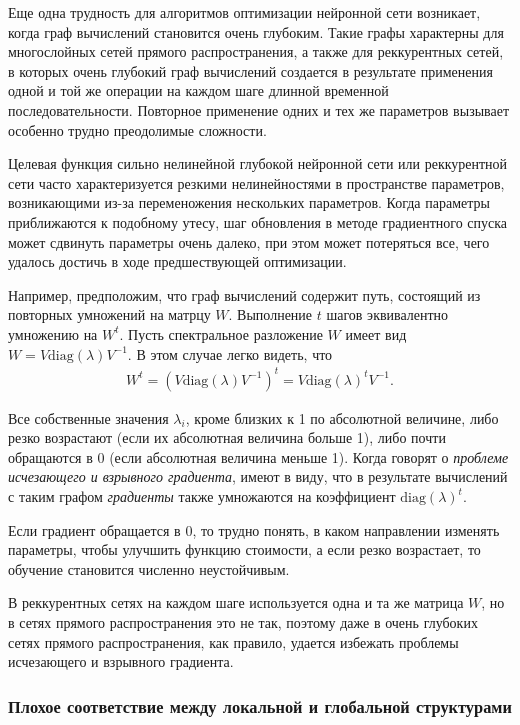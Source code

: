 \documentclass[%
	11pt,
	a4paper,
	utf8,
]{article}
\begin{document}
Еще одна трудность для алгоритмов оптимизации нейронной сети возникает, когда граф вычислений становится очень глубоким. Такие графы характерны для многослойных сетей прямого распространения, а также для реккурентных сетей, в которых очень глубокий граф вычислений создается в результате применения одной и той же операции на каждом шаге длинной временной последовательности. Повторное применение одних и тех же параметров вызывает особенно трудно преодолимые сложности.

Целевая функция сильно нелинейной глубокой нейронной сети или реккурентной сети часто характеризуется резкими нелинейностями в пространстве параметров, возникающими из-за переменожения нескольких параметров. Когда параметры приближаются к подобному утесу, шаг обновления в методе градиентного спуска может сдвинуть параметры очень далеко, при этом может потеряться все, чего удалось достичь в ходе предшествующей оптимизации.

Например, предположим, что граф вычислений содержит путь, состоящий из повторных умножений на матрцу $ W $. Выполнение $ t $ шагов эквивалентно умножению на $ W^t $. Пусть спектральное разложение $ W $ имеет вид $ W = V \text{diag}(\lambda) V^{-1} $. В этом случае легко видеть, что
\begin{align*}
	W^t = (V \text{diag}(\lambda) V^{-1})^t = V \text{diag}(\lambda)^t V^{-1}.
\end{align*}

Все собственные значения $ \lambda_i $, кроме близких к 1 по абсолютной величине, либо резко возрастают (если их абсолютная величина больше 1), либо почти обращаются в 0 (если абсолютная величина меньше 1). Когда говорят о \emph{проблеме исчезающего и взрывного градиента}, имеют в виду, что в результате вычислений с таким графом \emph{градиенты} также умножаются на коэффициент $ \text{diag}(\lambda)^t $.

Если градиент обращается в 0, то трудно понять, в каком направлении изменять параметры, чтобы улучшить функцию стоимости, а если резко возрастает, то обучение становится численно неустойчивым.

В реккурентных сетях на каждом шаге используется одна и та же матрица $ W $, но в сетях прямого распространения это не так, поэтому даже в очень глубоких сетях прямого распространения, как правило, удается избежать проблемы исчезающего и взрывного градиента.

\subsubsection{Плохое соответствие между локальной и глобальной структурами}
\end{document}
